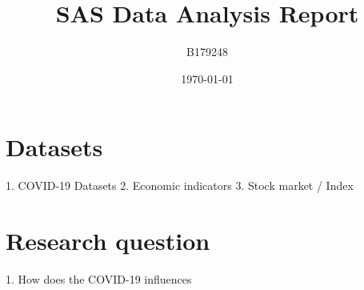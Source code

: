 \documentclass{report}
\title{SAS Data Analysis Report}
\author{B179248}
\date{\today}
\begin{document}
\marktitle
\section{Datasets}
1. COVID-19 Datasets
2. Economic indicators
3. Stock market / Index

\section{Research question}
1. How does the COVID-19 influences 
\end{document}
